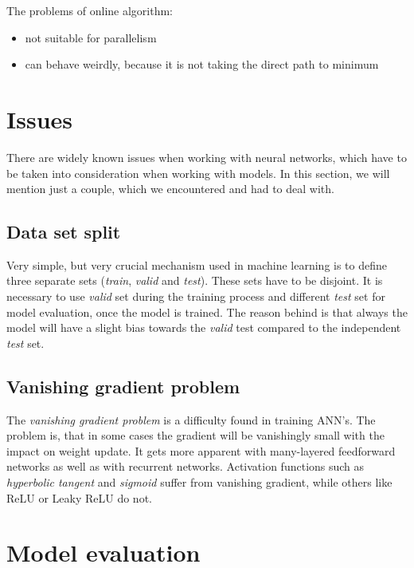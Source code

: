 \noindent
The problems of online algorithm:

\begin{itemize}

\item not suitable for parallelism
\item can behave weirdly, because it is not taking the direct path to minimum

\end{itemize}

\section{Issues}

There are widely known issues when working with neural networks, which have to be taken into consideration when working with models. In this section, we will mention just a couple, which we encountered and had to deal with.

\subsection{Data set split}

Very simple, but very crucial mechanism used in machine learning is to define three separate sets (\textit{train}, \textit{valid} and \textit{test}). These sets have to be disjoint. It is necessary to use \textit{valid} set during the training process and different \textit{test} set for model evaluation, once the model is trained. The reason behind is that always the model will have a slight bias towards the \textit{valid} test compared to the independent \textit{test} set.

\subsection{Vanishing gradient problem}

\label{vanishing_gradient}

The \textit{vanishing gradient problem}\cite{vanishing_gradient} is a difficulty found in training ANN's. The problem is, that in some cases the gradient will be vanishingly small with the impact on weight update. It gets more apparent with many-layered feedforward networks as well as with recurrent networks. Activation functions such as \textit{hyperbolic tangent} and \textit{sigmoid} suffer from vanishing gradient, while others like ReLU or Leaky ReLU do not.

\section{Model evaluation}
\label{nn-metrics}

